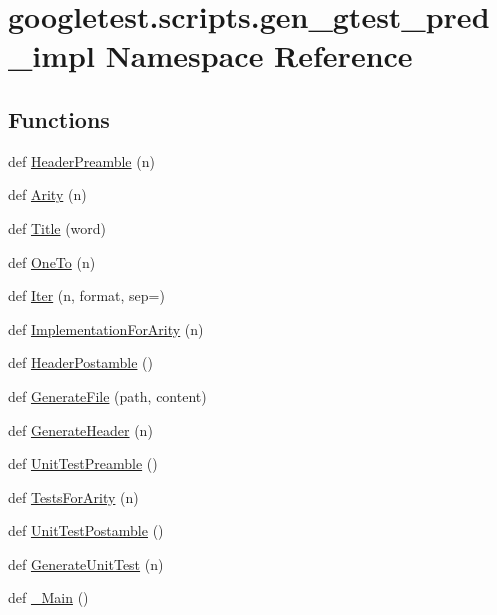 \hypertarget{namespacegoogletest_1_1scripts_1_1gen__gtest__pred__impl}{}\section{googletest.\+scripts.\+gen\+\_\+gtest\+\_\+pred\+\_\+impl Namespace Reference}
\label{namespacegoogletest_1_1scripts_1_1gen__gtest__pred__impl}
\subsection*{Functions}
\begin{DoxyCompactItemize}
\item 
def \mbox{\hyperlink{namespacegoogletest_1_1scripts_1_1gen__gtest__pred__impl_ab6b5c7b538445816b4068108287ddb98}{Header\+Preamble}} (n)
\item 
def \mbox{\hyperlink{namespacegoogletest_1_1scripts_1_1gen__gtest__pred__impl_af67125c00cdd1f3860dbca51ac5fe869}{Arity}} (n)
\item 
def \mbox{\hyperlink{namespacegoogletest_1_1scripts_1_1gen__gtest__pred__impl_a86d14c2f4656b60cefe4c3f556a1f325}{Title}} (word)
\item 
def \mbox{\hyperlink{namespacegoogletest_1_1scripts_1_1gen__gtest__pred__impl_aff65c970b0fa35339cbfe53a97499ce4}{One\+To}} (n)
\item 
def \mbox{\hyperlink{namespacegoogletest_1_1scripts_1_1gen__gtest__pred__impl_a5022be9de6397e5835285a0dc7d48a08}{Iter}} (n, format, sep=\textquotesingle{}\textquotesingle{})
\item 
def \mbox{\hyperlink{namespacegoogletest_1_1scripts_1_1gen__gtest__pred__impl_a5a986bb00c959dca3c59f84facf50d97}{Implementation\+For\+Arity}} (n)
\item 
def \mbox{\hyperlink{namespacegoogletest_1_1scripts_1_1gen__gtest__pred__impl_a5ced94dbdb35505facb1eb8f9b38dc43}{Header\+Postamble}} ()
\item 
def \mbox{\hyperlink{namespacegoogletest_1_1scripts_1_1gen__gtest__pred__impl_a2f2af8a9f9cb8901616f70359c464681}{Generate\+File}} (path, content)
\item 
def \mbox{\hyperlink{namespacegoogletest_1_1scripts_1_1gen__gtest__pred__impl_a2705335707586b24cc478f362f81034d}{Generate\+Header}} (n)
\item 
def \mbox{\hyperlink{namespacegoogletest_1_1scripts_1_1gen__gtest__pred__impl_a0bb682dad551f5fc92a64133dd123c7a}{Unit\+Test\+Preamble}} ()
\item 
def \mbox{\hyperlink{namespacegoogletest_1_1scripts_1_1gen__gtest__pred__impl_ab79fc4240cc9581f0c71f2f088d18292}{Tests\+For\+Arity}} (n)
\item 
def \mbox{\hyperlink{namespacegoogletest_1_1scripts_1_1gen__gtest__pred__impl_a4c934c79a2247479224b01389fcd42bd}{Unit\+Test\+Postamble}} ()
\item 
def \mbox{\hyperlink{namespacegoogletest_1_1scripts_1_1gen__gtest__pred__impl_a67e3a1a91ac339842cc74d50f4692891}{Generate\+Unit\+Test}} (n)
\item 
def \mbox{\hyperlink{namespacegoogletest_1_1scripts_1_1gen__gtest__pred__impl_a1a2a54c1392ab53994303c43ba0ee9d3}{\+\_\+\+Main}} ()
\end{DoxyCompactItemize}
